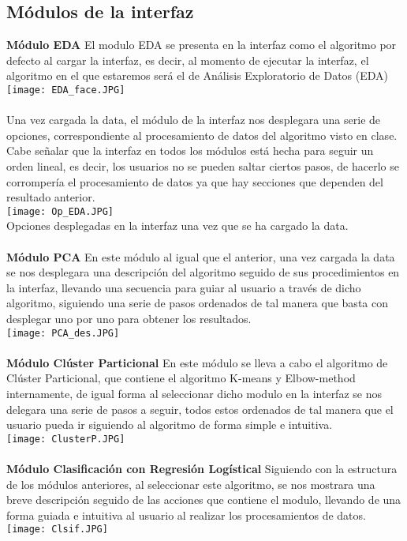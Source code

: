 \documentclass[10pt,a4paper]{article}
\begin{document}
\subsection*{Módulos de la interfaz }
    \textbf{Módulo EDA}
        El modulo EDA se presenta en la interfaz como el algoritmo por defecto al cargar la interfaz, es decir, al momento de ejecutar la interfaz, el algoritmo en el que estaremos será el de Análisis Exploratorio de Datos (EDA)\\
\texttt{[image: EDA\_face.JPG]}
\\ \\
Una vez cargada la data, el módulo de la interfaz nos desplegara una serie de opciones, correspondiente al procesamiento de datos del algoritmo visto en clase. Cabe señalar que la interfaz en todos los módulos está hecha para seguir un orden lineal, es decir, los usuarios no se pueden saltar ciertos pasos, de hacerlo se corrompería el procesamiento de datos ya que hay secciones que dependen del resultado anterior. \\

\texttt{[image: Op\_EDA.JPG]}\\
Opciones desplegadas en la interfaz una vez que se ha cargado la data.
\\\\
\textbf{Módulo PCA}
    En este módulo al igual que el anterior, una vez cargada la data se nos desplegara una descripción del algoritmo seguido de sus procedimientos en la interfaz, llevando una secuencia para guiar al usuario a través de dicho algoritmo, siguiendo una serie de pasos ordenados de tal manera que basta con desplegar uno por uno para obtener los resultados.\\
    \texttt{[image: PCA\_des.JPG]}\\ \\

\textbf{Módulo Clúster Particional }
    En este módulo se lleva a cabo el algoritmo de Clúster Particional, que contiene el algoritmo K-means y Elbow-method internamente, de igual forma al seleccionar dicho modulo en la interfaz se nos delegara una serie de pasos a seguir, todos estos ordenados de tal manera que el usuario pueda ir siguiendo al algoritmo de forma simple e intuitiva. \\
    \texttt{[image: ClusterP.JPG]}\\\\
    
\textbf{Módulo Clasificación con Regresión Logístical }
   Siguiendo con la estructura de los módulos anteriores, al seleccionar este algoritmo, se nos mostrara una breve descripción seguido de las acciones que contiene el modulo, llevando de una forma guiada e intuitiva al usuario al realizar los procesamientos de datos.   \\
   \texttt{[image: Clsif.JPG]}\\\\
\end{document}
